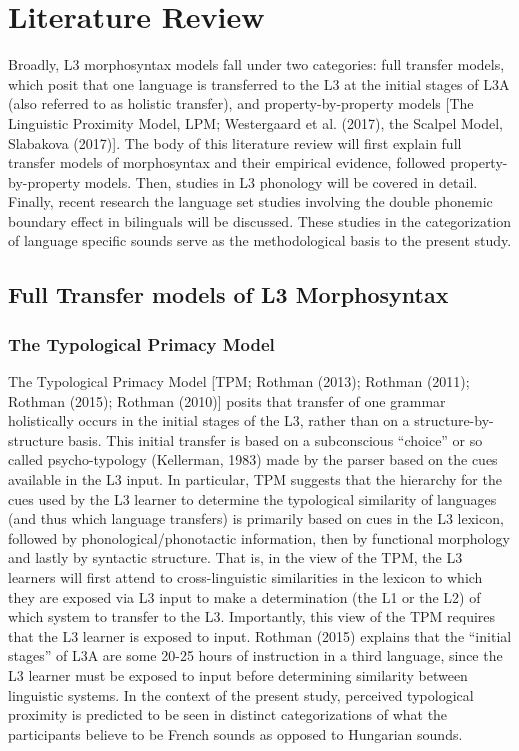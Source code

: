 \documentclass[
  man]{apa6}
\begin{document}
\hypertarget{literature-review}{%
\section{Literature Review}\label{literature-review}}

Broadly, L3 morphosyntax models fall under two categories: full transfer models, which posit that one language is transferred to the L3 at the initial stages of L3A (also referred to as holistic transfer), and property-by-property models {[}The Linguistic Proximity Model, LPM; Westergaard et al. (2017), the Scalpel Model, Slabakova (2017){]}. The body of this literature review will first explain full transfer models of morphosyntax and their empirical evidence, followed property-by-property models.
Then, studies in L3 phonology will be covered in detail.
Finally, recent research the language set studies involving the double phonemic boundary effect in bilinguals will be discussed. These studies in the categorization of language specific sounds serve as the methodological basis to the present study.

\hypertarget{full-transfer-models-of-l3-morphosyntax}{%
\subsection{Full Transfer models of L3 Morphosyntax}\label{full-transfer-models-of-l3-morphosyntax}}

\hypertarget{the-typological-primacy-model}{%
\subsubsection{The Typological Primacy Model}\label{the-typological-primacy-model}}

The Typological Primacy Model {[}TPM; Rothman (2013); Rothman (2011); Rothman (2015); Rothman (2010){]} posits that transfer of one grammar holistically occurs in the initial stages of the L3, rather than on a structure-by-structure basis.
This initial transfer is based on a subconscious ``choice'' or so called psycho-typology (Kellerman, 1983) made by the parser based on the cues available in the L3 input.
In particular, TPM suggests that the hierarchy for the cues used by the L3 learner to determine the typological similarity of languages (and thus which language transfers) is primarily based on cues in the L3 lexicon, followed by phonological/phonotactic information, then by functional morphology and lastly by syntactic structure.
That is, in the view of the TPM, the L3 learners will first attend to cross-linguistic similarities in the lexicon to which they are exposed via L3 input to make a determination (the L1 or the L2) of which system to transfer to the L3.
Importantly, this view of the TPM requires that the L3 learner is exposed to input.
Rothman (2015) explains that the ``initial stages'' of L3A are some 20-25 hours of instruction in a third language, since the L3 learner must be exposed to input before determining similarity between linguistic systems.
In the context of the present study, perceived typological proximity is predicted to be seen in distinct categorizations of what the participants believe to be French sounds as opposed to Hungarian sounds.
\end{document}
